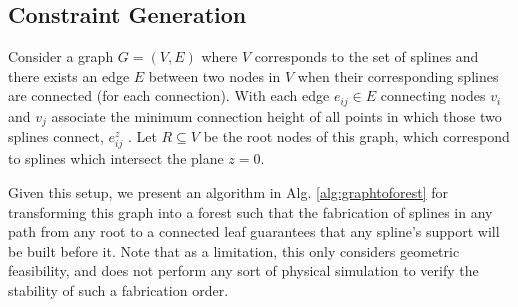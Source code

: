 \documentclass[conference]{acmsiggraph}
\begin{document}
\subsection{Constraint Generation}

Consider a graph $G = (V, E)$ where $V$ corresponds to the set of splines and there exists an edge $E$ between two nodes in $V$ when their corresponding splines are connected (for each connection).  With each edge $e_{ij} \in E$ connecting nodes $v_i$ and $v_j$ associate the minimum connection height of all points in which those two splines connect, $e_{ij}^z$
.  Let $R \subseteq V$ be the root nodes of this graph, which correspond to splines which intersect the plane $z=0$.



Given this setup, we present an algorithm in Alg. \ref{alg:graphtoforest} for transforming this graph into a forest such that the fabrication of splines in any path from any root to a connected leaf guarantees that any spline's support will be built before it.  Note that as a limitation, this only considers geometric feasibility, and does not perform any sort of physical simulation to verify the stability of such a fabrication order.
\end{document}
